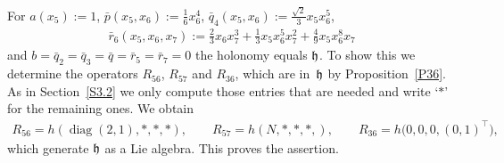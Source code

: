 \documentclass[pdftex]{sigma}
\numberwithin{equation}{section}
\newcommand\fh{{\frak h}}
\newcommand{\diag}{\operatorname{diag}}
\begin{document}
\begin{Example}\label{Ex37}
For $a(x_5):=1$, $\bar p(x_5,x_6):=\frac16 x_6^4$, $\bar q_4(x_5,x_6):=\frac {\sqrt2}3x_5 x_6^5$, \begin{gather*}\bar r_6(x_5,x_6,x_7):= \tfrac23 x_6 x_7^3+\tfrac13 x_5x_6^5 x_7^2+\tfrac 49 x_5x_6^8x_7 \end{gather*}
and $b=\bar q_2=\bar q_3 =\bar q=\bar r_5= \bar r_7=0$ the holonomy equals $\fh$. To show this we determine the operators $R_{56}$, $R_{57}$ and $R_{36}$, which are in~$\fh$ by Proposition~\ref{P36}. As in Section~\ref{S3.2} we only compute those entries that are needed and write `$*$' for the remaining ones. We obtain
\begin{gather*}R_{56}=h(\diag(2,1), *,*,*),\qquad R_{57}=h(N,*,*,*,),\qquad R_{36}=h\big(0,0,0,(0,1)^\top\big),\end{gather*}
which generate $\fh$ as a Lie algebra. This proves the assertion.
\end{Example}
\end{document}

